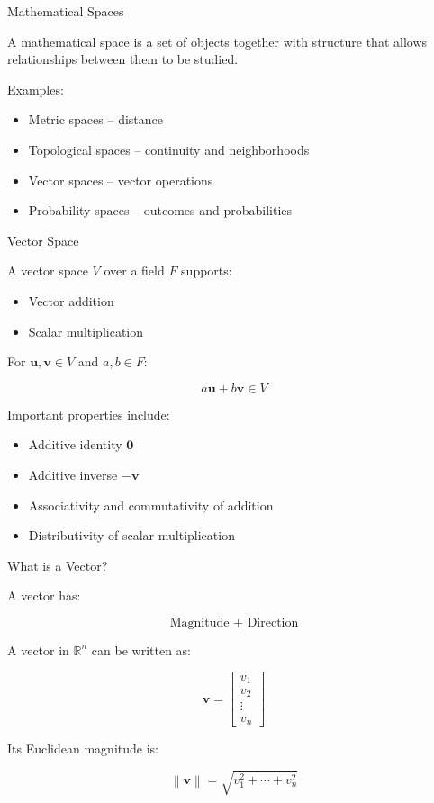 \documentclass[aspectratio=169,11pt]{beamer}
\newcommand{\R}{\mathbb{R}}
\newcommand{\norm}[1]{\left\lVert #1\right\rVert}
\begin{document}
\begin{frame}{Mathematical Spaces}

A mathematical space is a set of objects together with structure that allows relationships between them to be studied.

Examples:

\begin{itemize}
    \item Metric spaces -- distance
    \item Topological spaces -- continuity and neighborhoods
    \item Vector spaces -- vector operations
    \item Probability spaces -- outcomes and probabilities
\end{itemize}

\end{frame}

\begin{frame}{Vector Space}

A vector space $V$ over a field $F$ supports:

\begin{itemize}
    \item Vector addition
    \item Scalar multiplication
\end{itemize}

For $\mathbf u,\mathbf v\in V$ and $a,b\in F$:

\[
\boxed{
a\mathbf u+b\mathbf v\in V
}
\]

Important properties include:

\begin{itemize}
    \item Additive identity $\mathbf0$
    \item Additive inverse $-\mathbf v$
    \item Associativity and commutativity of addition
    \item Distributivity of scalar multiplication
\end{itemize}

\end{frame}

\begin{frame}{What is a Vector?}

A vector has:

\[
\boxed{\text{Magnitude + Direction}}
\]

A vector in $\R^n$ can be written as:

\[
\mathbf v=
\begin{bmatrix}
v_1\\v_2\\\vdots\\v_n
\end{bmatrix}
\]

Its Euclidean magnitude is:

\[
\boxed{
\norm{\mathbf v}
=
\sqrt{v_1^2+\cdots+v_n^2}
}
\]

\end{frame}
\end{document}
